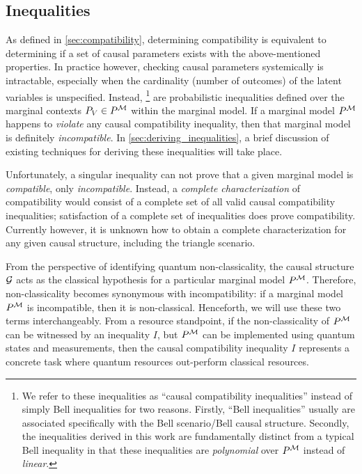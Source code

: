 \documentclass[aps, 10pt, english, twoside, pra, nofootinbib, tightenlines, longbibliography]{revtex4-1}
\begin{document}
    \subsection{Inequalities}
    As defined in \cref{sec:compatibility}, determining compatibility is equivalent to determining if a set of causal parameters exists with the above-mentioned properties. In practice however, checking causal parameters systemically is intractable, especially when the cardinality (number of outcomes) of the latent variables is unspecified. Instead, \footnote{We refer to these inequalities as ``causal compatibility inequalities'' instead of simply Bell inequalities for two reasons. Firstly, ``Bell inequalities'' usually are associated specifically with the Bell scenario/Bell causal structure. Secondly, the inequalities derived in this work are fundamentally distinct from a typical Bell inequality in that these inequalities are \textit{polynomial} over $\prob^{\mscenario}$ instead of \textit{linear}.} are probabilistic inequalities defined over the marginal contexts $\prob[V] \in \prob^{\mscenario}$ within the marginal model. If a marginal model $\prob^{\mscenario}$ happens to \textit{violate} any causal compatibility inequality, then that marginal model is definitely \textit{incompatible}. In \cref{sec:deriving_inequalities}, a brief discussion of existing techniques for deriving these inequalities will take place.

    Unfortunately, a singular inequality can not prove that a given marginal model is \textit{compatible}, only \textit{incompatible}. Instead, a \textit{complete characterization} of compatibility would consist of a complete set of all valid causal compatibility inequalities; satisfaction of a complete set of inequalities does prove compatibility. Currently however, it is unknown how to obtain a complete characterization for any given causal structure, including the triangle scenario.

    From the perspective of identifying quantum non-classicality, the causal structure $\mathcal{G}$ acts as the classical hypothesis for a particular marginal model $\prob^{\mscenario}$. Therefore, non-classicality becomes synonymous with incompatibility: if a marginal model $\prob^{\mscenario}$ is incompatible, then it is non-classical. Henceforth, we will use these two terms interchangeably. From a resource standpoint, if the non-classicality of $\prob^{\mscenario}$ can be witnessed by an inequality $I$, but $\prob^{\mscenario}$ can be implemented using quantum states and measurements, then the causal compatibility inequality $I$ represents a concrete task where quantum resources out-perform classical resources.
\end{document}
